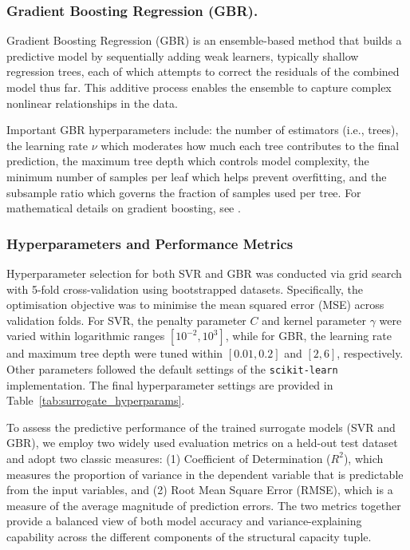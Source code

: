 \documentclass[authoryear,preprint,review,12pt]{elsarticle}
\begin{document}
\subsubsection{Gradient Boosting Regression (GBR).}
Gradient Boosting Regression (GBR) is an ensemble-based method that builds a predictive model by sequentially adding weak learners, typically shallow regression trees, each of which attempts to correct the residuals of the combined model thus far. This additive process enables the ensemble to capture complex nonlinear relationships in the data.

Important GBR hyperparameters include: the number of estimators (i.e., trees), the learning rate $\nu$ which moderates how much each tree contributes to the final prediction, the maximum tree depth which controls model complexity, the minimum number of samples per leaf which helps prevent overfitting, and the subsample ratio which governs the fraction of samples used per tree. For mathematical details on gradient boosting, see \citep{Friedman2001GBR}.

\subsubsection{Hyperparameters and Performance Metrics}
Hyperparameter selection for both SVR and GBR was conducted via grid search with 5-fold cross-validation using bootstrapped datasets. Specifically, the optimisation objective was to minimise the mean squared error (MSE) across validation folds. For SVR, the penalty parameter $C$ and kernel parameter $\gamma$ were varied within logarithmic ranges $[10^{-2}, 10^{3}]$, while for GBR, the learning rate and maximum tree depth were tuned within $[0.01, 0.2]$ and $[2, 6]$, respectively. Other parameters followed the default settings of the \texttt{scikit-learn} implementation. The final hyperparameter settings are provided in Table~\ref{tab:surrogate_hyperparams}. 

To assess the predictive performance of the trained surrogate models (SVR and GBR), we employ two widely used evaluation metrics on a held-out test dataset and adopt two classic measures: (1) {Coefficient of Determination ($R^2$)}, which measures the proportion of variance in the dependent variable that is predictable from the input variables, and (2) {Root Mean Square Error (RMSE)}, which is a measure of the average magnitude of prediction errors. The two metrics together provide a balanced view of both model accuracy and variance-explaining capability across the different components of the structural capacity tuple.
\end{document}
